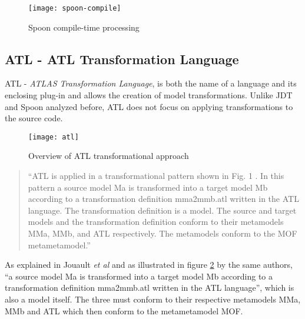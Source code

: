	\begin{figure}[h]
	  \begin{center}
	    \leavevmode
	    \texttt{[image: spoon-compile]}
	    \caption{Spoon compile-time processing \cite{pawlak2006spoon}}
	    \label{fig:spoon-compile}
	  \end{center}
	\end{figure}

\subsection{ATL - ATL Transformation Language }
	ATL - \emph{ATLAS Transformation Language}, is both the name of a language and its enclosing plug-in and allows the creation of model transformations. Unlike JDT and Spoon analyzed before, ATL does not focus on applying transformations to the source code.

	\begin{figure}[h]
	  \begin{center}
	    \leavevmode
	    \texttt{[image: atl]}
	    \caption{Overview of ATL transformational approach \cite{jouault2006transforming}}
	    \label{fig:so-atl-wow}
	  \end{center}
	\end{figure}

	\begin{quote}
		``ATL is applied in a transformational pattern shown in Fig. 1 . In this pattern a source model Ma is transformed into a target model Mb according to a transformation definition mma2mmb.atl written in the ATL language. The transformation definition is a model. The source and target models and the transformation definition conform to their metamodels MMa, MMb, and ATL respectively. The metamodels conform to the MOF metametamodel.''
	\end{quote}

	As explained in Jouault \emph{et al} and as illustrated in figure \ref{fig:so-atl-wow} by the same authors, ``a source model Ma is transformed into a target model Mb according to a transformation definition mma2mmb.atl written in the ATL language'', which is also a model itself. The three must conform to their respective metamodels MMa, MMb and ATL which then conform to the metametamodel MOF.


